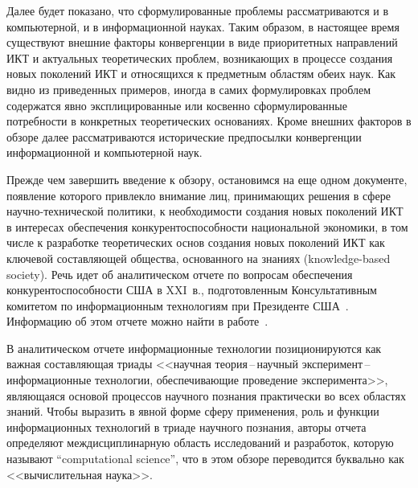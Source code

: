 \begin{multicols}{2}
      Далее будет показано, что сформулированные проблемы рассматриваются и в
компьютерной, и в информационной науках. Таким образом, в настоящее время существуют
внешние факторы конвергенции в виде приоритетных направлений ИКТ и актуальных
теоретических проблем, воз\-ни\-ка\-ющих в процессе создания новых поколений ИКТ и
относящихся к предметным областям обеих наук. Как видно из приведенных примеров, иногда
в самих формулировках проблем содержатся явно эксплицированные или косвенно
сформулированные потреб\-но\-сти в конкретных теоретических основаниях. Кроме внешних
факторов в обзоре далее
 рассматриваются исторические предпосылки конвергенции
информационной и компьютерной наук.

      Прежде чем завершить введение к обзору, остановимся на еще одном документе,
появление которого привлекло внимание лиц, принимающих решения в сфере 
научно-технической политики, к необходимости создания новых поколений ИКТ в интересах
обеспечения конкурентоспособности национальной экономики, в том числе к разработке
теоретических основ создания новых поколений ИКТ как ключевой составляющей общества,
основанного на знаниях (knowledge-based society). Речь идет об аналитическом отчете по
вопросам обеспечения конкурентоспособности США в XXI~в., подготовленным
Консультативным комитетом по информационным технологиям при Президенте
США~\cite{10za}. Информацию об этом отчете можно найти в работе~\cite{11za}.

      В аналитическом отчете информационные техно\-ло\-гии позиционируются как важная
со\-став\-ля\-ющая триады <<научная тео\-рия\,--\,на\-уч\-ный экс\-пе\-ри\-мент\,--\,ин\-фор\-ма\-ци\-он\-ные
технологии, обеспечивающие проведение эксперимента>>, являющаяся основой процессов
научного познания практически во всех областях знаний. Чтобы выразить в явной форме сферу
применения, роль и функции информационных технологий в триаде научного познания, авторы
отчета определяют междисциплинарную область исследований и разработок, которую
называют ``computational science'', что в этом обзоре переводится буквально как
<<вычислительная наука>>.


\end{multicols}
